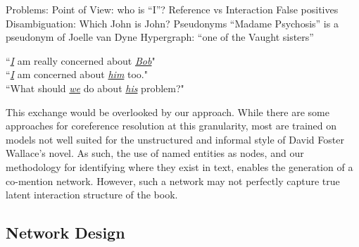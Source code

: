 \documentclass[sigconf]{acmart}
\begin{document}
Problems:
Point of View: who is “I”?
Reference vs Interaction
False positives
Disambiguation: Which John is John?
Pseudonyms
“Madame Psychosis” is a pseudonym of Joelle van Dyne
Hypergraph: “one of the Vaught sisters”

\begin{displayquote}
``\emph{\underline{I}} am really concerned about \emph{\underline{Bob}}"\\
``\emph{\underline{I}} am concerned about \emph{\underline{him}} too."\\
``What should \underline{\emph{we}} do about \underline{\emph{his}} problem?"
\end{displayquote}

This exchange would be overlooked by our approach. While there are some approaches for coreference resolution at this granularity, most are trained on models not well suited for the unstructured and informal style of David Foster Wallace's novel. As such, the use of named entities as nodes, and our methodology for identifying where they exist in text, enables the generation of a co-mention network. However, such a network may not perfectly capture true latent interaction structure of the book.

\subsection{Network Design}
\end{document}

